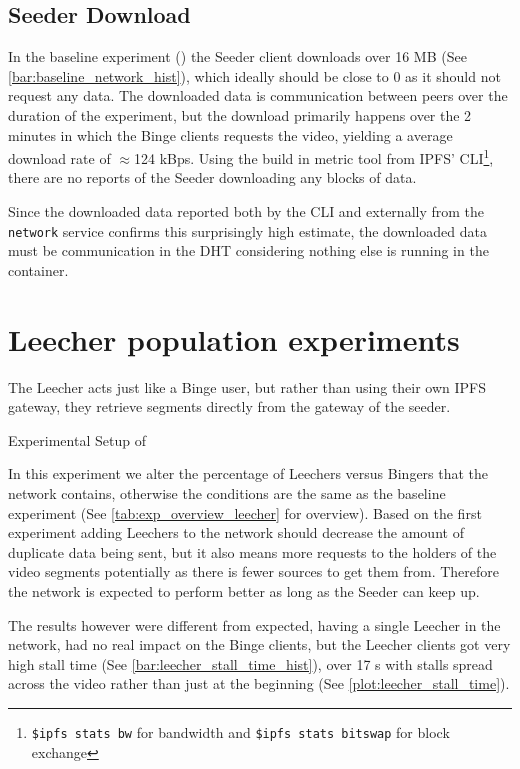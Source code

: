 \subsection{Seeder Download}
\label{sec:eval_seeder_rx}
In the baseline experiment () the Seeder client downloads over 16 \ac{MB} (See \autoref{bar:baseline_network_hist}), which ideally should be close to 0 as it should not request any data. The downloaded data is communication between peers over the duration of the experiment, but the download primarily happens over the 2 minutes in which the Binge clients requests the video, yielding a average download rate of $\approx$124 \ac{kBps}. Using the build in metric tool from \ac{IPFS}' \ac{CLI}\footnote{\texttt{\$ipfs stats bw} for bandwidth and \texttt{\$ipfs stats bitswap} for block exchange}, there are no reports of the Seeder downloading any blocks of data.

Since the downloaded data reported both by the \ac{CLI} and externally from the \texttt{network} service confirms this surprisingly high estimate, the downloaded data must be communication in the \acs{DHT} considering nothing else is running in the container.


\FloatBarrier \section{Leecher population experiments}
\label{sec:eval_leecher}
The Leecher acts just like a Binge user, but rather than using their own \ac{IPFS} gateway, they retrieve segments directly from the gateway of the seeder.

\begin{table}[!htbp]
\myfloatalign
\caption[Experimental Setup of Leecher]{Experimental Setup of }
\label{tab:exp_overview_leecher}

\end{table}

In this experiment we alter the percentage of Leechers versus Bingers that the network contains, otherwise the conditions are the same as the baseline experiment (See \autoref{tab:exp_overview_leecher} for overview).
Based on the first experiment adding Leechers to the network should decrease the amount of duplicate data being sent, but it also means more requests to the holders of the video segments potentially as there is fewer sources to get them from. Therefore the network is expected to perform better as long as the Seeder can keep up.

The results however were different from expected, having a single Leecher in the network, had no real impact on the Binge clients, but the Leecher clients got very high stall time (See \autoref{bar:leecher_stall_time_hist}), over 17 \ac{s} with stalls spread across the video rather than just at the beginning (See \autoref{plot:leecher_stall_time}). 

